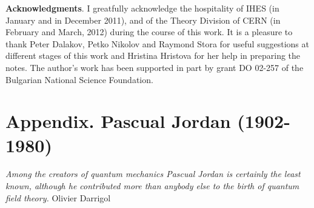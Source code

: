 {\bf Acknowledgments}. I greatfully acknowledge the hospitality of IHES (in January and in December 2011), and of the Theory Division of CERN (in February and March, 2012) during the course of this work. It is a pleasure to thank Peter Dalakov, Petko Nikolov and Raymond Stora for useful suggestions at different stages of this work and Hristina Hristova for her help in preparing the notes. The author's work has been supported in part by grant DO 02-257 of the Bulgarian National Science Foundation.
\newpage

\section*{Appendix. Pascual Jordan (1902-1980)}

\hfill\begin{minipage}{.7\linewidth}
{\it Among the creators of quantum mechanics Pascual Jordan is certainly the least known, although
he contributed more than anybody else to the birth of quantum field theory.}
Olivier Darrigol \cite{Dar}
\end{minipage}

\bigskip

